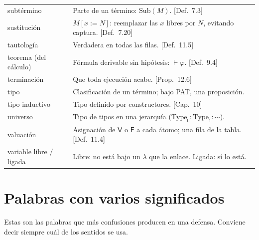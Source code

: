 \documentclass[11pt,a4paper]{article}
\begin{document}
{\begin{longtable}{@{}p{}p{}@{}}
subtérmino & Parte de un término: \(\mathrm{Sub}(M)\). [Def.\ 7.3]\\
sustitución & \(M[x:=N]\): reemplazar las \(x\) libres por \(N\), evitando captura. [Def.\ 7.20]\\
tautología & Verdadera en todas las filas. [Def.\ 11.5]\\
teorema (del cálculo) & Fórmula derivable sin hipótesis: \(\vdash\varphi\). [Def.\ 9.4]\\
terminación & Que toda ejecución acabe. [Prop.\ 12.6]\\
tipo & Clasificación de un término; bajo PAT, una proposición.\\
tipo inductivo & Tipo definido por constructores. [Cap.\ 10]\\
universo & Tipo de tipos en una jerarquía (\(\mathrm{Type}_0:\mathrm{Type}_1:\cdots\)).\\
valuación & Asignación de \(\mathsf V\) o \(\mathsf F\) a cada átomo; una fila de la tabla. [Def.\ 11.4]\\
variable libre / ligada & Libre: no está bajo un \(\lambda\) que la enlace. Ligada: sí lo está.\\
\bottomrule
\end{longtable}
}

\section{Palabras con varios significados}

Estas son las palabras que más confusiones producen en una defensa. Conviene
decir siempre cuál de los sentidos se usa.
\end{document}
